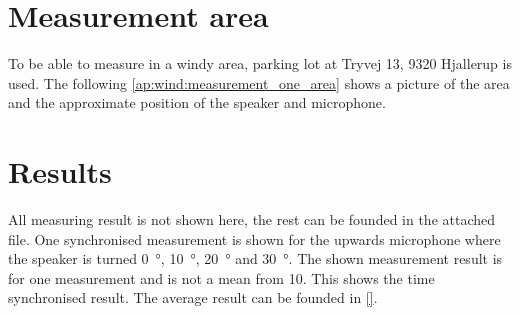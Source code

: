 \section*{Measurement area}
To be able to measure in a windy area, parking lot at Tryvej 13, 9320 Hjallerup is used. The following \autoref{ap:wind:measurement_one_area} shows a picture of the area and the approximate position of the speaker and microphone.


\section*{Results}

All measuring result is not shown here, the rest can be founded in the attached file. One synchronised measurement is shown for the upwards microphone where the speaker is turned \SI{0}{\degree}, \SI{10}{\degree}, \SI{20}{\degree} and \SI{30}{\degree}. The shown measurement result is for one measurement and is not a mean from 10. This shows the time synchronised result. The average result can be founded in \autoref{}.










